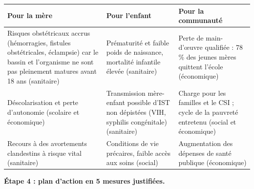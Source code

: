 \documentclass[11pt]{article}
\begin{document}
\begin{exoresolu}
\begin{center}
\begin{tabularx}{\linewidth}{|X|X|X|}
\hline
\rowcolor{popblueL} \textbf{Pour la mère} & \textbf{Pour l'enfant} & \textbf{Pour la communauté} \\
\hline
Risques obstétricaux accrus (hémorragies, fistules obstétricales, éclampsie) car le bassin et l'organisme ne sont pas pleinement matures avant 18 ans (sanitaire) & Prématurité et faible poids de naissance, mortalité infantile élevée (sanitaire) & Perte de main-d'œuvre qualifiée : 78\,\% des jeunes mères quittent l'école (économique) \\
\hline
Déscolarisation et perte d'autonomie (scolaire et économique) & Transmission mère-enfant possible d'IST non dépistées (VIH, syphilis congénitale) (sanitaire) & Charge pour les familles et le CSI ; cycle de la pauvreté entretenu (social et économique) \\
\hline
Recours à des avortements clandestins à risque vital (sanitaire) & Conditions de vie précaires, faible accès aux soins (social) & Augmentation des dépenses de santé publique (économique) \\
\hline
\end{tabularx}
\end{center}

\textbf{Étape 4 : plan d'action en 5 mesures justifiées.}


\end{exoresolu}
\end{document}
